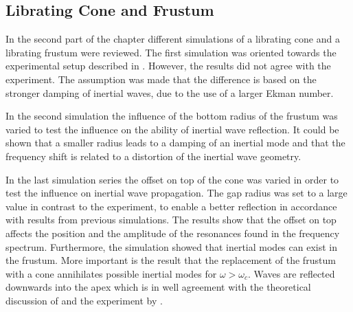 \subsection{Librating Cone and Frustum }

In the second part of the chapter different simulations of
a librating cone and a librating frustum were reviewed.
The first simulation was oriented towards the experimental setup described in \citep{Beardsley1970}.
However, the results  did not agree with the experiment.
The assumption was made that the difference is based on the  stronger damping of inertial waves,
due to the use of a larger Ekman number.

In the second simulation the influence of the bottom radius of the frustum was varied
to test the influence on the ability of inertial wave reflection.
It could be shown that a smaller radius leads to a damping of an inertial mode and that the frequency
shift is related to a distortion of the inertial wave geometry.

In the last simulation series  the offset on top of the cone was varied in order to test the influence on
inertial wave propagation. The gap radius was set to a large value in contrast to the experiment,
to enable a better reflection in accordance with results from previous simulations.
The results  show that the offset on top affects the position and the amplitude of the resonances
found in the frequency spectrum.
Furthermore, the simulation showed that inertial modes can exist in the frustum.
More important is the result that the replacement of the frustum with a cone annihilates possible
inertial modes for $\omega > \omega_c$.
Waves are reflected downwards into the apex which is in well agreement with the
theoretical discussion of \citep{Greenspan1969} and the experiment by \citep{Beardsley1970}.

